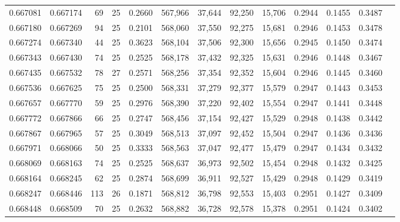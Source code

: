 \begin{tabular}{rrrrrrrrrrrrr}
0.667081 & 0.667174 &  69 &  25 &                                     0.2660 & 567,966 &  37,644 &  92,250 &  15,706 & 0.2944 & 0.1455 & 0.3487 \\
0.667180 & 0.667269 &  94 &  25 &                                     0.2101 & 568,060 &  37,550 &  92,275 &  15,681 & 0.2946 & 0.1453 & 0.3478 \\
0.667274 & 0.667340 &  44 &  25 &                                     0.3623 & 568,104 &  37,506 &  92,300 &  15,656 & 0.2945 & 0.1450 & 0.3474 \\
0.667343 & 0.667430 &  74 &  25 &                                     0.2525 & 568,178 &  37,432 &  92,325 &  15,631 & 0.2946 & 0.1448 & 0.3467 \\
0.667435 & 0.667532 &  78 &  27 &                                     0.2571 & 568,256 &  37,354 &  92,352 &  15,604 & 0.2946 & 0.1445 & 0.3460 \\
0.667536 & 0.667625 &  75 &  25 &                                     0.2500 & 568,331 &  37,279 &  92,377 &  15,579 & 0.2947 & 0.1443 & 0.3453 \\
0.667657 & 0.667770 &  59 &  25 &                                     0.2976 & 568,390 &  37,220 &  92,402 &  15,554 & 0.2947 & 0.1441 & 0.3448 \\
0.667772 & 0.667866 &  66 &  25 &                                     0.2747 & 568,456 &  37,154 &  92,427 &  15,529 & 0.2948 & 0.1438 & 0.3442 \\
0.667867 & 0.667965 &  57 &  25 &                                     0.3049 & 568,513 &  37,097 &  92,452 &  15,504 & 0.2947 & 0.1436 & 0.3436 \\
0.667971 & 0.668066 &  50 &  25 &                                     0.3333 & 568,563 &  37,047 &  92,477 &  15,479 & 0.2947 & 0.1434 & 0.3432 \\
0.668069 & 0.668163 &  74 &  25 &                                     0.2525 & 568,637 &  36,973 &  92,502 &  15,454 & 0.2948 & 0.1432 & 0.3425 \\
0.668164 & 0.668245 &  62 &  25 &                                     0.2874 & 568,699 &  36,911 &  92,527 &  15,429 & 0.2948 & 0.1429 & 0.3419 \\
0.668247 & 0.668446 & 113 &  26 &                                     0.1871 & 568,812 &  36,798 &  92,553 &  15,403 & 0.2951 & 0.1427 & 0.3409 \\
0.668448 & 0.668509 &  70 &  25 &                                     0.2632 & 568,882 &  36,728 &  92,578 &  15,378 & 0.2951 & 0.1424 & 0.3402 \\

\end{tabular}
